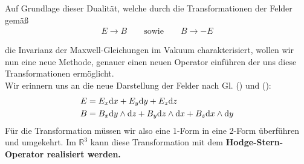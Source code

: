 Auf Grundlage dieser Dualität, welche durch die Transformationen der Felder gemäß
\begin{align*}
E \rightarrow B \qquad \text{sowie} \qquad B \rightarrow -E
\end{align*}

die Invarianz der Maxwell-Gleichungen im Vakuum charakterisiert, wollen wir nun eine neue Methode, genauer einen neuen Operator einführen der uns diese Transformationen ermöglicht. \\
Wir erinnern uns an die neue Darstellung der Felder nach Gl. () und ():
\begin{align*}
E &= E_x \dd x +E_y \dd y + E_z \dd z   \\
B &= B_x \dd y \wedge \dd z + B_y \dd z \wedge \dd x + B_z \dd x \wedge \dd y 
\end{align*}
Für die Transformation müssen wir also eine 1-Form in eine 2-Form überführen und umgekehrt. Im $\mathbb{R}^3$ kann diese Transformation mit dem \bfseries Hodge-Stern-Operator \normalfont realisiert werden.